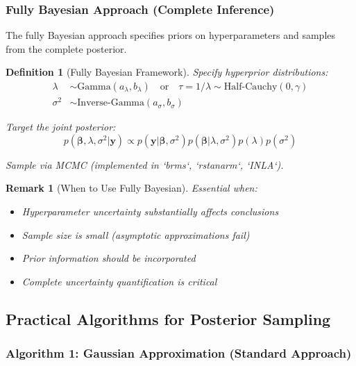 \documentclass[12pt]{article}
\newtheorem{definition}{Definition}
\newtheorem{remark}{Remark}
\begin{document}
\subsubsection{Fully Bayesian Approach (Complete Inference)}

The fully Bayesian approach specifies priors on hyperparameters and samples from the complete posterior.

\begin{definition}[Fully Bayesian Framework]
Specify hyperprior distributions:
\begin{align}
\lambda &\sim \text{Gamma}(a_\lambda, b_\lambda) \quad \text{or} \quad \tau = 1/\lambda \sim \text{Half-Cauchy}(0, \gamma) \\
\sigma^2 &\sim \text{Inverse-Gamma}(a_\sigma, b_\sigma)
\end{align}

Target the joint posterior:
\begin{equation}
p(\boldsymbol{\beta}, \lambda, \sigma^2 | \mathbf{y}) \propto p(\mathbf{y}|\boldsymbol{\beta}, \sigma^2) p(\boldsymbol{\beta}|\lambda, \sigma^2) p(\lambda) p(\sigma^2)
\end{equation}

Sample via MCMC (implemented in `brms`, `rstanarm`, `INLA`).
\end{definition}

\begin{remark}[When to Use Fully Bayesian]
Essential when:
\begin{itemize}
    \item Hyperparameter uncertainty substantially affects conclusions
    \item Sample size is small (asymptotic approximations fail)
    \item Prior information should be incorporated
    \item Complete uncertainty quantification is critical
\end{itemize}
\end{remark}

\subsection{Practical Algorithms for Posterior Sampling}

\subsubsection{Algorithm 1: Gaussian Approximation (Standard Approach)}
\end{document}
